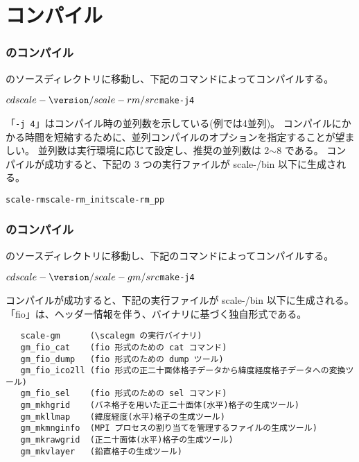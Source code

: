 \section{コンパイル} \label{sec:compile}

\subsubsection{\scalerm のコンパイル}

\scalerm のソースディレクトリに移動し、下記のコマンドによってコンパイルする。
\begin{alltt}
 $ cd scale-{\version}/scale-rm/src
 $ make -j 4
\end{alltt}
「\verb|-j 4|」はコンパイル時の並列数を示している(例では4並列)。
コンパイルにかかる時間を短縮するために、並列コンパイルのオプションを指定することが望ましい。
並列数は実行環境に応じて設定し、推奨の並列数は 2$\sim$8 である。
コンパイルが成功すると、下記の 3 つの実行ファイルが scale-{\version}/bin 以下に生成される。
\begin{alltt}
 scale-rm  scale-rm_init  scale-rm_pp
\end{alltt}

\subsubsection{{\scalegm}のコンパイル} %

{\scalegm}のソースディレクトリに移動し、下記のコマンドによってコンパイルする。
\begin{alltt}
  $  cd scale-{\version}/scale-gm/src
  $  make -j 4
\end{alltt}
コンパイルが成功すると、下記の実行ファイルが scale-{\version}/bin 以下に生成される。
「fio」は、ヘッダー情報を伴う、バイナリに基づく独自形式である。
\begin{verbatim}
   scale-gm      (\scalegm の実行バイナリ)
   gm_fio_cat    (fio 形式のための cat コマンド)
   gm_fio_dump   (fio 形式のための dump ツール)
   gm_fio_ico2ll (fio 形式の正二十面体格子データから緯度経度格子データへの変換ツール)
   gm_fio_sel    (fio 形式のための sel コマンド)
   gm_mkhgrid    (バネ格子を用いた正二十面体(水平)格子の生成ツール)
   gm_mkllmap    (緯度経度(水平)格子の生成ツール)
   gm_mkmnginfo  (MPI プロセスの割り当てを管理するファイルの生成ツール)
   gm_mkrawgrid  (正二十面体(水平)格子の生成ツール)
   gm_mkvlayer   (鉛直格子の生成ツール)
\end{verbatim}


